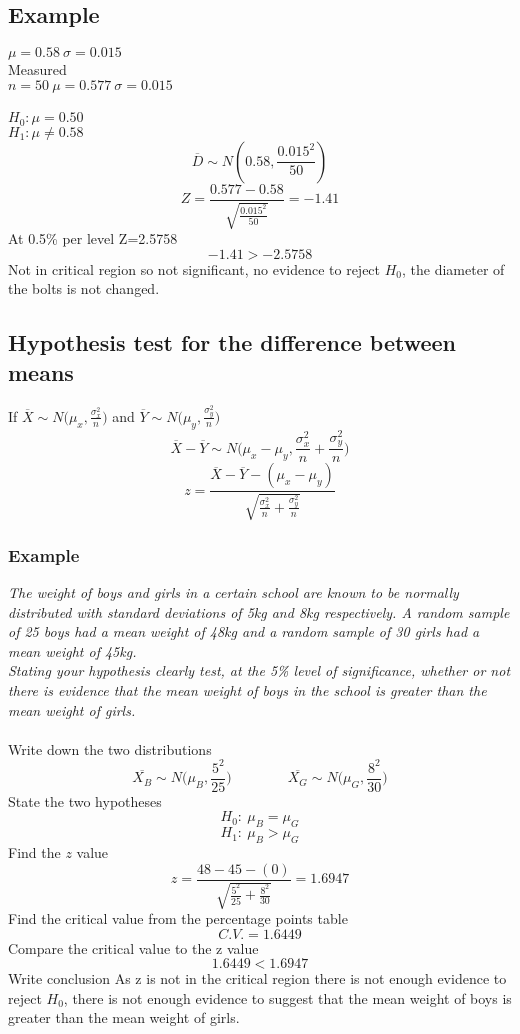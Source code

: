 \documentclass{article}[18pt]
\begin{document}
\subsection{Example}
$\mu=0.58 \ \sigma=0.015$\\
Measured\\
$n=50 \ \mu=0.577 \ \sigma=0.015$\\
\\
$H_0: \mu=0.50$\\
$H_1: \mu\neq0.58$\\
$$\overline{D}\sim N(0.58,\frac{0.015^2}{50})$$
$$Z=\frac{0.577-0.58}{\sqrt{\frac{0.015^2}{50}}}=-1.41$$
At 0.5\%  per level Z=2.5758
$$-1.41>-2.5758$$
Not in critical region so not significant, no evidence to reject $H_0$, the diameter of the bolts is not changed.
\newpage
\subsection{Hypothesis test for the difference between means}
If $\overline{X}\sim N\Big(\mu_x,\frac{\sigma^2_x}{n}\Big)$ and $\overline{Y}\sim N\Big(\mu_y,\frac{\sigma^2_y}{n}\Big)$
$$\overline{X}-\overline{Y}\sim N\Bigg(\mu_x-\mu_y,\frac{\sigma^2_x}{n}+\frac{\sigma^2_y}{n}\Bigg)$$
$$z=\frac{\overline{X}-\overline{Y}-(\mu_x-\mu_y)}{\sqrt{\frac{\sigma^2_x}{n}+\frac{\sigma^2_y}{n}}}$$
\subsubsection{Example}
\textit{The weight of boys and girls in a certain school are known to be normally distributed with standard deviations of 5kg and 8kg respectively. A random sample of 25 boys had a mean weight of 48kg and a random sample of 30 girls had a mean weight of 45kg.\\
Stating your hypothesis clearly test, at the 5\% level of significance, whether or not there is evidence that the mean weight of boys in the school is greater than the mean weight of girls.}\\
\\
Write down the two distributions
$$\overline{X_B}\sim N\Big(\mu_B,\frac{5^2}{25}\Big) \qquad \qquad \overline{X_G}\sim N\Big(\mu_G,\frac{8^2}{30}\Big)$$
State the two hypotheses
$$H_0: \ \mu_B=\mu_G$$
$$H_1: \ \mu_B>\mu_G$$
Find the $z$ value
$$z=\frac{48-45-(0)}{\sqrt{\frac{5^2}{25}+\frac{8^2}{30}}}=1.6947$$
Find the critical value from the percentage points table
$$C.V.=1.6449$$
Compare the critical value to the z value
$$1.6449<1.6947$$
Write conclusion
As z is not in the critical region there is not enough evidence to reject $H_0$, there is not enough evidence to suggest that the mean weight of boys is greater than the mean weight of girls.
\end{document}
